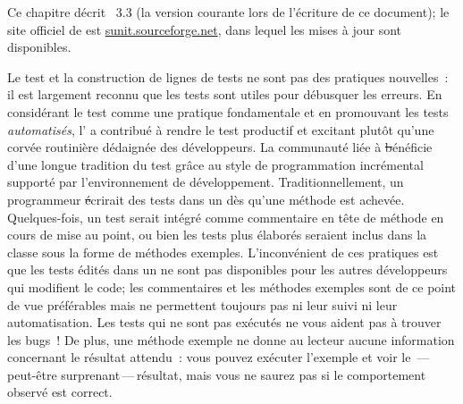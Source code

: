 \documentclass[a4paper,10pt,twoside]{book}
\begin{document}
Ce chapitre décrit \SUnit~3.3 (la version courante lors de l'écriture de ce document); le site officiel de \sunit est \url{sunit.sourceforge.net}, dans lequel les mises à jour sont disponibles.

Le test et la construction de lignes de tests ne sont pas des pratiques nouvelles~: il est largement reconnu que les tests sont utiles pour débusquer les erreurs. En considérant le test comme une pratique fondamentale et en promouvant les tests \emph{automatisés}, l'\mbox{} a contribué à rendre le test productif et excitant plutôt qu'une corvée routinière dédaignée des développeurs. La communauté liée à \st bénéficie d'une longue tradition du test grâce au style de programmation incrémental supporté par l'environnement de développement.
Traditionnellement, un programmeur \st écrirait des tests dans un  dès qu'une méthode est achevée. Quelques-fois, un test serait intégré comme commentaire en tête de méthode en cours de mise au point, ou bien les tests plus élaborés seraient inclus dans la classe sous la forme de méthodes exemples. L'inconvénient de ces pratiques est que les tests édités dans un  ne sont pas disponibles pour les autres développeurs qui modifient le code; les commentaires et les méthodes exemples sont de ce point de vue préférables mais ne permettent toujours pas ni leur suivi ni leur automatisation. 
Les tests qui ne sont pas exécutés ne vous aident pas à trouver les bugs~! De plus, une méthode exemple ne donne au lecteur aucune information concernant le résultat attendu~: vous pouvez exécuter l'exemple et voir le \,---\,peut-être surprenant\,---\,résultat, mais vous ne saurez pas si le comportement observé est correct.
\end{document}
